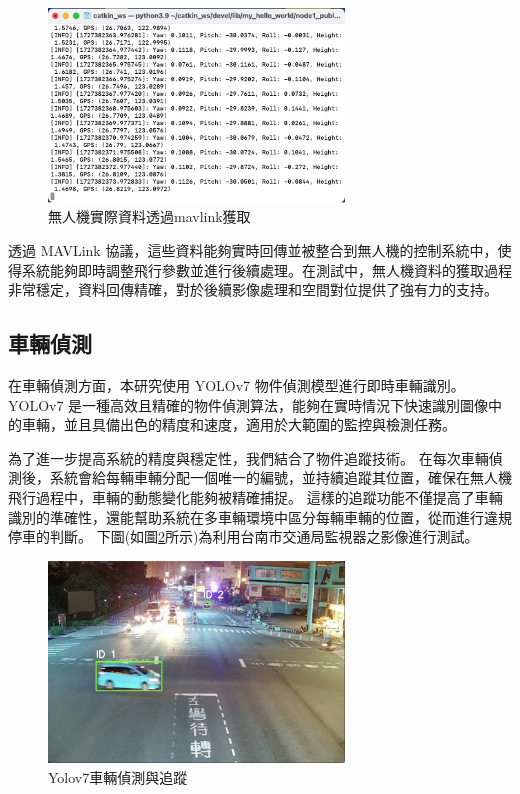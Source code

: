 \documentclass[12pt]{article}       %
\begin{document}
\begin{figure}[H]
    \centering
    \includegraphics[width=0.7\textwidth]{mavlink.jpg}     %
    \caption{無人機實際資料透過mavlink獲取}    %
    \label{fig:mavlink}    %
\end{figure}

透過 MAVLink 協議，這些資料能夠實時回傳並被整合到無人機的控制系統中，使得系統能夠即時調整飛行參數並進行後續處理。在測試中，無人機資料的獲取過程非常穩定，資料回傳精確，對於後續影像處理和空間對位提供了強有力的支持。

\subsection{車輛偵測}
\hspace{2em}
在車輛偵測方面，本研究使用 YOLOv7 物件偵測模型進行即時車輛識別。
YOLOv7 是一種高效且精確的物件偵測算法，能夠在實時情況下快速識別圖像中的車輛，並且具備出色的精度和速度，適用於大範圍的監控與檢測任務。

為了進一步提高系統的精度與穩定性，我們結合了物件追蹤技術。
在每次車輛偵測後，系統會給每輛車輛分配一個唯一的編號，並持續追蹤其位置，確保在無人機飛行過程中，車輛的動態變化能夠被精確捕捉。
這樣的追蹤功能不僅提高了車輛識別的準確性，還能幫助系統在多車輛環境中區分每輛車輛的位置，從而進行違規停車的判斷。
下圖(如圖\ref{fig:yoloreal}所示)為利用台南市交通局監視器\cite{taiwantrafficvideo}之影像進行測試。

\begin{figure}[H]
    \centering
    \includegraphics[width=0.7\textwidth]{yoloreal2.png}     %
    \caption{Yolov7車輛偵測與追蹤}    %
    \label{fig:yoloreal}    %
\end{figure}
\end{document}
